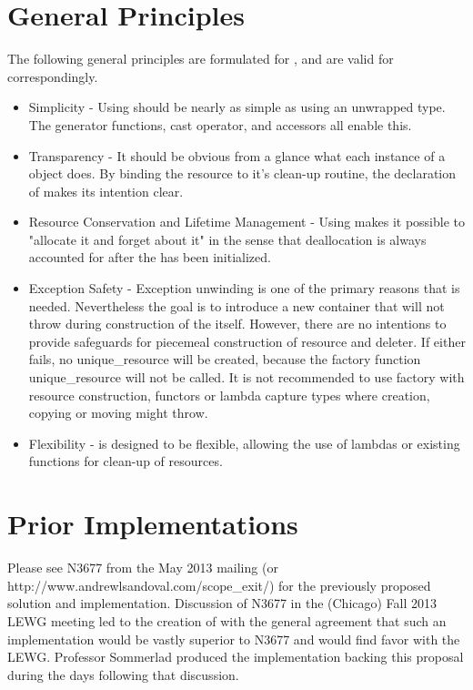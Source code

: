 \documentclass[ebook,11pt,article]{memoir}
\begin{document}
\section{General Principles}
The following general principles are formulated for , and are valid for  correspondingly.
\begin{itemize}
\item Simplicity - Using  should be nearly as simple as using an unwrapped type.  The generator functions, cast operator, and accessors all enable this.
\item Transparency - It should be obvious from a glance what each instance of a  object does.  By binding the resource to it's clean-up routine, the declaration of  makes its intention clear.
\item Resource Conservation and Lifetime Management - Using  makes it possible to "allocate it and forget about it" in the sense that deallocation is always accounted for after the  has been initialized.
\item Exception Safety - Exception unwinding is one of the primary reasons that  is needed.  Nevertheless the goal is to introduce a new container that will not throw during construction of the  itself. However, there are no intentions to provide safeguards for piecemeal construction of resource and deleter. If either fails, no unique_resource will be created, because the factory function unique_resource will not be called. It is not recommended to use  factory with resource construction, functors or lambda capture types where creation, copying or moving might throw.
\item Flexibility -  is designed to be flexible, allowing the use of lambdas or existing functions for clean-up of resources. 
\end{itemize}

\section{Prior Implementations}
Please see N3677 from the May 2013 mailing (or http://www.andrewlsandoval.com/scope_exit/) for the previously proposed solution and implementation.  Discussion of N3677 in the (Chicago) Fall 2013 LEWG meeting led to the creation of  with the general agreement that such an implementation would be vastly superior to N3677 and would find favor with the LEWG.  Professor Sommerlad produced the implementation backing this proposal during the days following that discussion.
\end{document}
